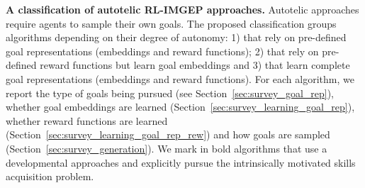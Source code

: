 \begin{landscape}
\begin{table*}[t!]
{\small \textbf{A classification of autotelic RL-IMGEP approaches.} \small Autotelic approaches require agents to sample their own goals. The proposed classification groups algorithms depending on their degree of autonomy: 1) \rlimgeps that rely on pre-defined goal representations (embeddings and reward functions); 2) \rlimgeps that rely on pre-defined reward functions but learn goal embeddings and 3) \rlimgeps that learn complete goal representations (embeddings and reward functions). For each algorithm, we report the type of goals being pursued (see Section~\ref{sec:survey_goal_rep}), whether goal embeddings are learned (Section~\ref{sec:survey_learning_goal_rep}), whether reward functions are learned (Section~\ref{sec:survey_learning_goal_rep_rew}) and how goals are sampled (Section~\ref{sec:survey_generation}). We mark in bold algorithms that use a developmental approaches and explicitly pursue the intrinsically motivated skills acquisition problem.}
\label{tab:bigtable}
\end{table*}
\end{landscape}